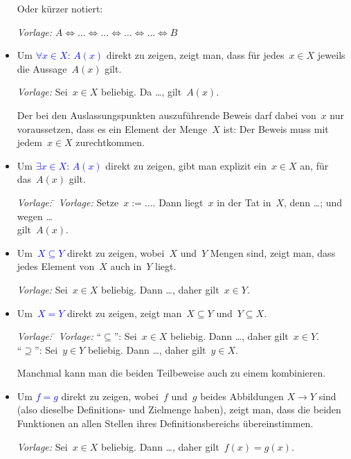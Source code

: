 \documentclass[12pt,a4paper,ngerman]{scrartcl}
\theoremstyle{definition}
\theoremstyle{plain}
\theoremstyle{remark}
\newcommand{\hil}[1]{\textcolor{blue}{#1}}
\begin{document}
\begin{itemize}
Oder kürzer notiert:

\emph{Vorlage:} $A \Leftrightarrow \ldots \Leftrightarrow \ldots
\Leftrightarrow \ldots \Leftrightarrow \ldots \Leftrightarrow B$

\item Um \hil{$\forall x\in X{:}\, A(x)$} direkt zu zeigen, zeigt man, dass für
jedes~$x \in X$ jeweils die Aussage~$A(x)$ gilt.

\emph{Vorlage:} Sei~$x \in X$ beliebig. Da \ldots, gilt~$A(x)$.

Der bei den Auslassungspunkten auszuführende Beweis darf dabei von~$x$ nur
voraussetzen, dass es ein Element der Menge~$X$ ist: Der Beweis muss mit
jedem~$x \in X$ zurechtkommen.

\item Um \hil{$\exists x \in X{:}\, A(x)$} direkt zu zeigen, gibt man explizit ein~$x
\in X$ an, für das~$A(x)$ gilt.

\begin{tabbing}
  \emph{Vorlage:} \= \kill
  \emph{Vorlage:} \> Setze~$x := \ldots$. Dann liegt~$x$ in der Tat in~$X$,
denn \ldots; und wegen \ldots \\
  \> gilt~$A(x)$.
\end{tabbing}

\item Um~\hil{$X \subseteq Y$} direkt zu zeigen, wobei~$X$ und~$Y$ Mengen sind,
zeigt man, dass jedes Element von~$X$ auch in~$Y$ liegt.

\emph{Vorlage:} Sei~$x \in X$ beliebig. Dann \ldots, daher gilt~$x \in Y$.

\item
Um~\hil{$X = Y$} direkt zu zeigen, zeigt man~$X \subseteq Y$ und~$Y \subseteq
X$.

\begin{tabbing}
  \emph{Vorlage:} \= \kill
  \emph{Vorlage:} \> "`$\subseteq$"': Sei~$x \in X$ beliebig. Dann \ldots,
  daher gilt~$x \in Y$. \\
  \> "`$\supseteq$"': Sei~$y \in Y$ beliebig. Dann \ldots, daher gilt~$y \in
  X$.
\end{tabbing}

Manchmal kann man die beiden Teilbeweise auch zu einem kombinieren.

\item Um \hil{$f = g$} direkt zu zeigen, wobei~$f$ und~$g$ beides Abbildungen
$X \to Y$ sind (also dieselbe Definitions- und Zielmenge haben), zeigt
man, dass die beiden Funktionen an allen Stellen ihres Definitionsbereichs
übereinstimmen.

\emph{Vorlage:} Sei~$x \in X$ beliebig. Dann \ldots, daher gilt~$f(x) = g(x)$.
\end{itemize}
\end{document}
